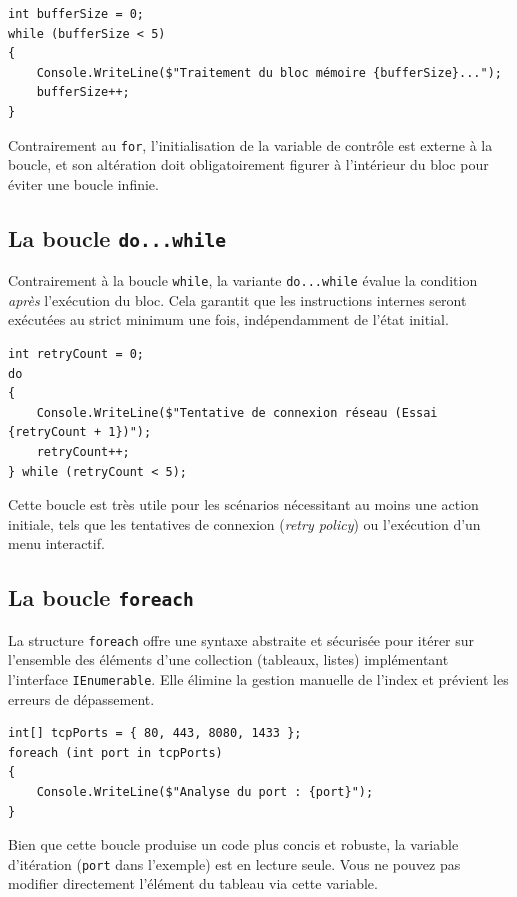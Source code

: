 \begin{lstlisting}[style=csharpstyle]
int bufferSize = 0;
while (bufferSize < 5)
{
    Console.WriteLine($"Traitement du bloc mémoire {bufferSize}...");
    bufferSize++;
}
\end{lstlisting}
Contrairement au \texttt{for}, l'initialisation de la variable de contrôle est externe à la boucle, et son altération doit obligatoirement figurer à l'intérieur du bloc pour éviter une boucle infinie.

\subsection{La boucle \texttt{do...while}}
Contrairement à la boucle \texttt{while}, la variante \texttt{do...while} évalue la condition \textit{après} l'exécution du bloc. Cela garantit que les instructions internes seront exécutées au strict minimum une fois, indépendamment de l'état initial.

\begin{lstlisting}[style=csharpstyle]
int retryCount = 0;
do
{
    Console.WriteLine($"Tentative de connexion réseau (Essai {retryCount + 1})");
    retryCount++;
} while (retryCount < 5);
\end{lstlisting}
Cette boucle est très utile pour les scénarios nécessitant au moins une action initiale, tels que les tentatives de connexion (\textit{retry policy}) ou l'exécution d'un menu interactif.

\subsection{La boucle \texttt{foreach}}
La structure \texttt{foreach} offre une syntaxe abstraite et sécurisée pour itérer sur l'ensemble des éléments d'une collection (tableaux, listes) implémentant l'interface \texttt{IEnumerable}. Elle élimine la gestion manuelle de l'index et prévient les erreurs de dépassement.

\begin{lstlisting}[style=csharpstyle]
int[] tcpPorts = { 80, 443, 8080, 1433 };
foreach (int port in tcpPorts)
{
    Console.WriteLine($"Analyse du port : {port}");
}
\end{lstlisting}
Bien que cette boucle produise un code plus concis et robuste, la variable d'itération (\texttt{port} dans l'exemple) est en lecture seule. Vous ne pouvez pas modifier directement l'élément du tableau via cette variable.

